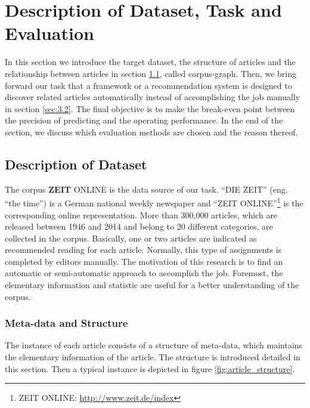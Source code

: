\section{Description of Dataset, Task and Evaluation}
\label{sec:3}

In this section we introduce the target dataset, the structure of articles and the relationship between articles in section \ref{sec:3.1}, called corpus-graph. Then, we bring forward our task that a framework or a recommendation system is designed to discover related articles automatically instead of accomplishing the job manually in section \ref{sec:3.2}. The final objective is to make the break-even point between the precision of predicting and the operating performance. In the end of the section, we discuss which evaluation methods are chosen and the reason thereof. 

\subsection{Description of Dataset}
\label{sec:3.1}

The corpus \textbf{ZEIT} ONLINE is the data source of our task. ``DIE ZEIT'' (eng. ``the time'') is a German national weekly newspaper and ``ZEIT ONLINE''\footnote{ZEIT ONLINE: \url{http://www.zeit.de/index}} is the corresponding online representation. More than 300,000 articles, which are released between 1946 and 2014 and belong to 20 different categories, are collected in the corpus. Basically, one or two articles are indicated as recommended reading for each article. Normally, this type of assignments is completed by editors manually. The motivation of this research is to find an automatic or semi-automatic approach to accomplish the job. Foremost, the elementary information and statistic are useful for a better understanding of the corpus. 

\subsubsection{Meta-data and Structure}
\label{sec:3structure}

The instance of each article consists of a structure of meta-data, which maintains the elementary information of the article. The structure is introduced detailed in this section. Then a typical instance is depicted in figure \ref{fig:article_structure}.

